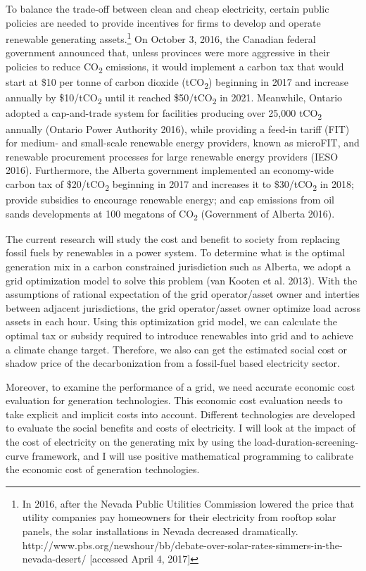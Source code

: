 To balance the trade-off between clean and cheap electricity, certain
public policies are needed to provide incentives for firms to develop
and operate renewable generating assets.\footnote{In 2016, after the
  Nevada Public Utilities Commission lowered the price that utility
  companies pay homeowners for their electricity from rooftop solar
  panels, the solar installations in Nevada decreased dramatically.
  http://www.pbs.org/newshour/bb/debate-over-solar-rates-simmers-in-the-nevada-desert/
  {[}accessed April 4, 2017{]}} On October 3, 2016, the Canadian federal
government announced that, unless provinces were more aggressive in
their policies to reduce CO\textsubscript{2} emissions, it would
implement a carbon tax that would start at \$10 per tonne of carbon
dioxide (tCO\textsubscript{2}) beginning in 2017 and increase annually
by \$10/tCO\textsubscript{2} until it reached \$50/tCO\textsubscript{2}
in 2021. Meanwhile, Ontario adopted a cap-and-trade system for
facilities producing over 25,000 tCO\textsubscript{2} annually (Ontario
Power Authority 2016), while providing a feed-in tariff (FIT) for
medium- and small-scale renewable energy providers, known as microFIT,
and renewable procurement processes for large renewable energy providers
(IESO 2016). Furthermore, the Alberta government implemented an
economy-wide carbon tax of \$20/tCO\textsubscript{2} beginning in 2017
and increases it to \$30/tCO\textsubscript{2} in 2018; provide subsidies
to encourage renewable energy; and cap emissions from oil sands
developments at 100 megatons of CO\textsubscript{2} (Government of
Alberta 2016).

The current research will study the cost and benefit to society from
replacing fossil fuels by renewables in a power system. To determine
what is the optimal generation mix in a carbon constrained jurisdiction
such as Alberta, we adopt a grid optimization model to solve this
problem (van Kooten et al. 2013). With the assumptions of rational
expectation of the grid operator/asset owner and interties between
adjacent jurisdictions, the grid operator/asset owner optimize load
across assets in each hour. Using this optimization grid model, we can
calculate the optimal tax or subsidy required to introduce renewables
into grid and to achieve a climate change target. Therefore, we also can
get the estimated social cost or shadow price of the decarbonization
from a fossil-fuel based electricity sector.

Moreover, to examine the performance of a grid, we need accurate
economic cost evaluation for generation technologies. This economic cost
evaluation needs to take explicit and implicit costs into account.
Different technologies are developed to evaluate the social benefits and
costs of electricity. I will look at the impact of the cost of
electricity on the generating mix by using the
load-duration-screening-curve framework, and I will use positive
mathematical programming to calibrate the economic cost of generation
technologies.

